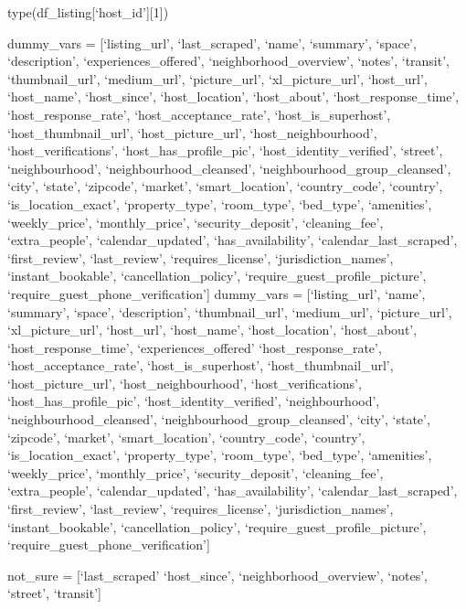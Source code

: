 \documentclass[11pt]{article}
\begin{document}
    type(df\_listing{[}`host\_id'{]}{[}1{]})

dummy\_vars = {[}`listing\_url', `last\_scraped', `name', `summary',
`space', `description', `experiences\_offered',
`neighborhood\_overview', `notes', `transit', `thumbnail\_url',
`medium\_url', `picture\_url', `xl\_picture\_url', `host\_url',
`host\_name', `host\_since', `host\_location', `host\_about',
`host\_response\_time', `host\_response\_rate',
`host\_acceptance\_rate', `host\_is\_superhost', `host\_thumbnail\_url',
`host\_picture\_url', `host\_neighbourhood', `host\_verifications',
`host\_has\_profile\_pic', `host\_identity\_verified', `street',
`neighbourhood', `neighbourhood\_cleansed',
`neighbourhood\_group\_cleansed', `city', `state', `zipcode', `market',
`smart\_location', `country\_code', `country', `is\_location\_exact',
`property\_type', `room\_type', `bed\_type', `amenities',
`weekly\_price', `monthly\_price', `security\_deposit', `cleaning\_fee',
`extra\_people', `calendar\_updated', `has\_availability',
`calendar\_last\_scraped', `first\_review', `last\_review',
`requires\_license', `jurisdiction\_names', `instant\_bookable',
`cancellation\_policy', `require\_guest\_profile\_picture',
`require\_guest\_phone\_verification'{]} dummy\_vars =
{[}`listing\_url', `name', `summary', `space', `description',
`thumbnail\_url', `medium\_url', `picture\_url', `xl\_picture\_url',
`host\_url', `host\_name', `host\_location', `host\_about',
`host\_response\_time', `experiences\_offered' `host\_response\_rate',
`host\_acceptance\_rate', `host\_is\_superhost', `host\_thumbnail\_url',
`host\_picture\_url', `host\_neighbourhood', `host\_verifications',
`host\_has\_profile\_pic', `host\_identity\_verified', `neighbourhood',
`neighbourhood\_cleansed', `neighbourhood\_group\_cleansed', `city',
`state', `zipcode', `market', `smart\_location', `country\_code',
`country', `is\_location\_exact', `property\_type', `room\_type',
`bed\_type', `amenities', `weekly\_price', `monthly\_price',
`security\_deposit', `cleaning\_fee', `extra\_people',
`calendar\_updated', `has\_availability', `calendar\_last\_scraped',
`first\_review', `last\_review', `requires\_license',
`jurisdiction\_names', `instant\_bookable', `cancellation\_policy',
`require\_guest\_profile\_picture',
`require\_guest\_phone\_verification'{]}

not\_sure = {[}`last\_scraped' `host\_since', `neighborhood\_overview',
`notes', `street', `transit'{]}
\end{document}
